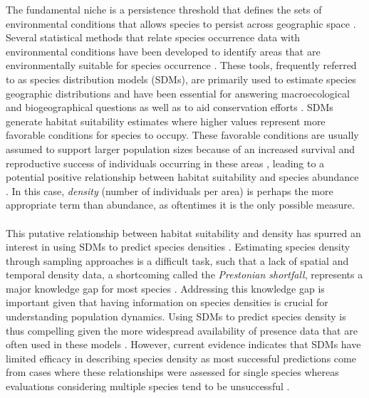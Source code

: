 The fundamental niche is a persistence threshold that defines the sets of environmental conditions that allows species to persist across geographic space \parencite{hutchinson1957,pulliam2000, colwell2009}. Several statistical methods that relate species occurrence data with environmental conditions have been developed to identify areas that are environmentally suitable for species occurrence \parencite{peterson2011}. These tools, frequently referred to as species distribution models (SDMs), are primarily used to estimate species geographic distributions and have been essential for answering macroecological and biogeographical questions as well as to aid conservation efforts \parencite{cayuela2009, calabrese2014,biber2020}. SDMs generate habitat suitability estimates where higher values represent more favorable conditions for species to occupy. These favorable conditions are usually assumed to support larger population sizes because of an increased survival and reproductive success of individuals occurring in these areas \parencite{weber2017,dallas2018,lee2022}, leading to a potential positive relationship between habitat suitability and species abundance \parencite{gomes2018}. In this case, \textit{density} (number of individuals per area) is perhaps the more appropriate term than abundance, as oftentimes it is the only possible measure. 


\paragraph*{}
This putative relationship between habitat suitability and density has spurred an interest in using SDMs to predict species densities \parencite{oliver2012sdm,acevedo2017,corbel2023}. Estimating species density through sampling approaches is a difficult task, such that a lack of spatial and temporal density data, a shortcoming called the \textit{Prestonian shortfall}, represents a major knowledge gap for most species \parencite{hortal2015}. Addressing this knowledge gap is important given that having information on species densities is crucial for understanding population dynamics. Using SDMs to predict species density is thus compelling given the more widespread availability of presence data that are often used in these models \parencite{pearce2006, bradley2016}. However, current evidence indicates that SDMs have limited efficacy in describing species density as most successful predictions come from cases where these relationships were assessed for single species whereas evaluations considering multiple species tend to be unsuccessful \parencite{weber2017,dallas2018,lee2022, waldock2022}.



